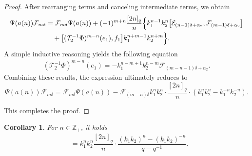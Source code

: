 \documentclass[12pt]{amsart}
\newtheorem{coro}[theorem]{Corollary}
\numberwithin{equation}{section}
\numberwithin{equation}{section}
\begin{document}
\begin{proof}
After rearranging terms and canceling intermediate terms, we obtain
\begin{align*}
\Psi(a(n))\mathcal{F}_{m\delta} &= \mathcal{F}_{m\delta}\Psi(a(n)) + (-1)^{m+n} \frac{[2n]_q}{n} \Bigl\{ k_1^{n-1} k_2^n \bigl[ \mathcal{E}_{(n-1)\delta+\alpha_2}, \mathcal{F}_{(m-1)\delta+\alpha_2} \bigr] \\
&\quad+ \bigl[ (\mathcal{T}_2^{-1}\Phi)^{m-n}(e_1), f_1 \bigr] k_1^{n+m-1} k_2^{n+m} \Bigr\}.
\end{align*}
A simple inductive reasoning yields the following equation
\begin{align}
(\mathcal{T}_2^{-1}\Phi)^{m-n}(e_1) = -k_1^{n-m+1} k_2^{n-m} \mathcal{F}_{(m-n-1)\delta+\alpha_2}. 
\end{align}
Combining these results, the expression ultimately reduces to
\[
\Psi(a(n))\mathcal{F}_{m\delta} = \mathcal{F}_{m\delta}\Psi(a(n)) - \mathcal{F}_{(m-n)\delta}k_1^n k_2^n \cdot \frac{[2n]_q}{n} \cdot \left( k_1^n k_2^n - k_1^{-n} k_2^{-n} \right).
\]

This completes the proof.
\end{proof}

\begin{coro}
For \(n\in\mathbb{Z}_{+}\), it holds  
\begin{align}   
[\Psi(a(n)), \mathcal{F}_{n\delta}]
&=k_1^n k_2^n \dfrac{[2n]_q}{n} \cdot \dfrac{(k_1k_2)^{n} - (k_1k_2)^{-n}}{q - q^{-1}}.
\end{align} 
\end{coro}
\end{document}
